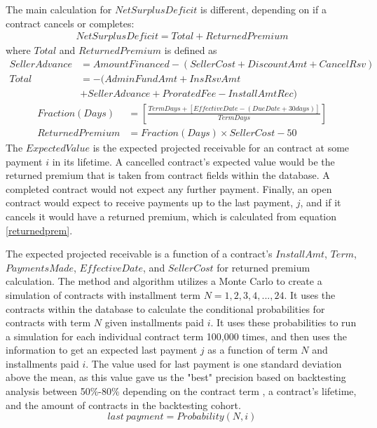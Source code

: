 \documentclass[titlepage]{article}
\begin{document}
The main calculation for $NetSurplusDeficit$ is different, depending on if a contract cancels or completes:
\begin{equation}
\begin{split}
NetSurplusDeficit = Total + ReturnedPremium
\end{split}
\end{equation}
where $Total$ and $ReturnedPremium$ is defined as
\begin{equation}
	\begin{split}
	SellerAdvance &= AmountFinanced - (SellerCost + DiscountAmt + CancelRsv)\\
	Total &= -(AdminFundAmt + InsRsvAmt\\
	&+ SellerAdvance + ProratedFee - InstallAmtRec)
	\end{split}
\end{equation}
\begin{equation}
\begin{split}\label{returnedprem}
Fraction(Days) &= \left[\frac{TermDays + \left[EffectiveDate - (DueDate + 30 days)\right]}{TermDays}\right]\\
ReturnedPremium &= Fraction(Days) \times SellerCost - 50
\end{split}
\end{equation}
The $ExpectedValue$ is the expected projected receivable for an contract at some payment $i$ in its lifetime. A cancelled contract's expected value would be the returned premium that is taken from contract fields within the database. A completed contract would not expect any further payment. Finally, an open contract would expect to receive payments up to the last payment, $j$, and if it cancels it would have a returned premium, which is calculated from equation \ref{returnedprem}. 

The expected projected receivable is a function of a contract's $InstallAmt$, $Term$, $PaymentsMade$, $EffectiveDate$, and $SellerCost$ for returned premium calculation. The method and algorithm utilizes a Monte Carlo to create a simulation of contracts with installment term $N = 1,2,3,4,...,24$. It uses the contracts within the database to calculate the conditional probabilities for contracts with term $N$ given installments paid $i$. It uses these probabilities to run a simulation for each individual contract term 100,000 times, and then uses the information to get an expected last payment $j$ as a function of term $N$ and installments paid $i$. The value used for last payment is one standard deviation above the mean, as this value gave us the "best" precision based on backtesting analysis between 50\%-80\% depending on the contract term , a contract's lifetime, and the amount of contracts in the backtesting cohort. 
\begin{equation}
last\ payment= Probability(N,i)
\end{equation}
\end{document}

